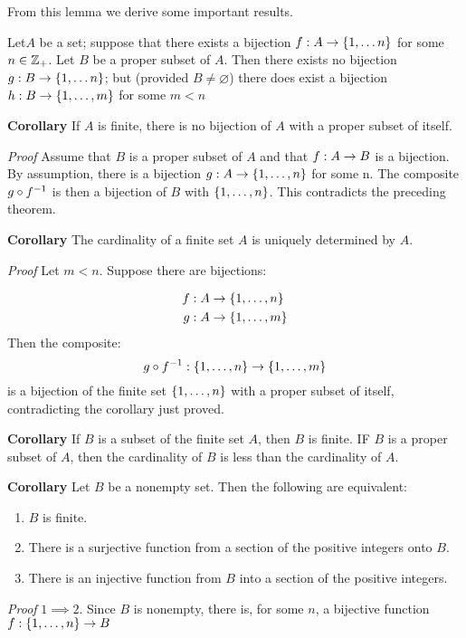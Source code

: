 From this lemma we derive some important results.

\begin{thm}
	Let$A$ be a set; suppose that there exists a bijection $ f : A \rightarrow \left\lbrace 1, \ldots n \right\rbrace$ for some $n \in \mathbb{Z}_+$. Let $B$ be a proper subset of $A$. Then there exists no bijection $g : B \rightarrow \left\lbrace 1, \ldots n \right\rbrace$; but (provided $B \neq \varnothing$) there does exist a bijection $h : B \rightarrow \left\lbrace 1, \ldots,m \right\rbrace$ for some $ m < n$
\end{thm}

\textbf{Corollary } If $ A $ is finite, there is no bijection of $A$ with a proper subset of itself.

\textit{Proof} Assume that $B$ is a proper subset of $A$ and that $ f : A \rightarrow B $ is a bijection. By assumption, there is a bijection $ g : A \rightarrow \left\lbrace 1, \ldots, n \right\rbrace $ for some n. The composite $ g \circ f^{-1}  $ is then a bijection of $B$ with $ \left\lbrace 1, \ldots, n \right\rbrace $. This contradicts the preceding theorem.

\textbf{Corollary}  The cardinality of a finite set $A$ is uniquely determined by $A$.

\textit{Proof} Let $ m<n $. Suppose there are bijections:

\begin{align*}
f: A &\rightarrow {\left\lbrace 1, \ldots, n \right\rbrace} \\
g: A &\rightarrow \left\lbrace 1, \ldots, m \right\rbrace
\end{align*}
Then the composite:
\[ g \circ f^{-1}: \left\lbrace 1, \ldots,n \right\rbrace \rightarrow \left\lbrace 1, \ldots,m \right\rbrace \]
is a bijection of the finite set $ \left\lbrace 1, \ldots,n \right\rbrace $ with a proper subset of itself, contradicting the corollary just proved.

\textbf{Corollary} If $B$ is a subset of the finite set $A$, then $B$ is finite. IF $B$ is a proper subset of $A$, then the cardinality of $B$ is less than the cardinality of $A$.

\textbf{Corollary} Let $B$ be a nonempty set. Then the following are equivalent:
\begin{enumerate}
	\item $B$ is finite.
	\item There is a surjective function from a section of the positive integers onto $B$.
	\item There is an injective function from $B$ into a section of the positive integers.
\end{enumerate}

\textit{Proof} $ 1 \implies 2 $. Since $B$ is nonempty, there is, for some $n$, a bijective function $ f : \left\lbrace 1, \ldots, n \right\rbrace \rightarrow B $

